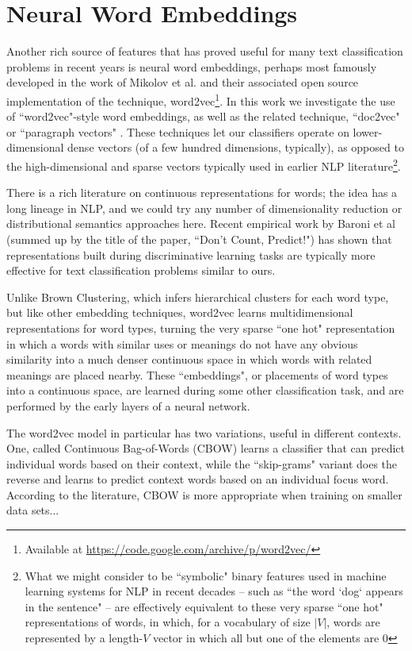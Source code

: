 \section{Neural Word Embeddings}
Another rich source of features that has proved useful for many text
classification problems in recent years is neural word embeddings, perhaps most
famously developed in the work of Mikolov et al. \cite{mikolovword2vec} and
their associated open source implementation of the technique,
word2vec\footnote{Available at
\url{https://code.google.com/archive/p/word2vec/}}. In this work we investigate
the use of ``word2vec"-style word embeddings, as well as the related technique,
``doc2vec" or ``paragraph vectors"
\cite{dai-document-embedding-2015,quocle-distributed-representations-2014}.
These techniques let our classifiers operate on lower-dimensional dense vectors
(of a few hundred dimensions, typically), as opposed to the high-dimensional
and sparse vectors typically used in earlier NLP literature\footnote{
What we might consider to be ``symbolic" binary features used in machine
learning systems for NLP in recent decades -- such as ``the word `dog` appears
in the sentence" -- are effectively equivalent to these very sparse ``one hot"
representations of words, in which, for a vocabulary of size $|V|$, words are
represented by a length-$V$ vector in which all but one of the elements are 0}.

There is a rich literature on continuous representations for words; the idea
has a long lineage in NLP, and we could try any number of dimensionality
reduction or distributional semantics approaches here. Recent empirical work by
Baroni et al \cite{baroni2014don} (summed up by the title of the paper, ``Don't
Count, Predict!") has shown that representations built during discriminative
learning tasks are typically more effective for text classification problems
similar to ours.

Unlike Brown Clustering, which infers hierarchical clusters for each word type,
but like other embedding techniques, word2vec learns multidimensional
representations for word types, turning the very sparse ``one hot"
representation in which a words with similar uses or meanings do not have any
obvious similarity into a much denser continuous space in which words with
related meanings are placed nearby. These ``embeddings", or placements of word
types into a continuous space, are learned during some other classification
task, and are performed by the early layers of a neural network.

The word2vec model in particular has two variations, useful in different
contexts. One, called Continuous Bag-of-Words (CBOW) learns a classifier that
can predict individual words based on their context, while the ``skip-grams"
variant does the reverse and learns to predict context words based on an
individual focus word. According to the literature, CBOW is more appropriate
when training on smaller data sets...

